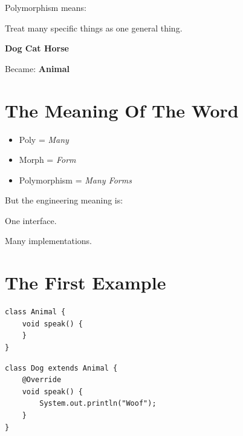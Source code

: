 \documentclass[11pt,a4paper]{book}
\begin{document}
\begin{idea}

Polymorphism means:

Treat many specific things
as one general thing.

\end{idea}

\textbf{ Dog   Cat   Horse }

Became:
\textbf{ Animal }

\section{The Meaning Of The Word}
\begin{itemize}
\item \textcolor{RosettaRoyalPurple}{Poly} = \emph{Many}


\item \textcolor{RosettaRoyalPurple}{Morph} = \emph{Form}


\item \textcolor{RosettaRoyalPurple}{Polymorphism} = \emph{Many Forms}
\end{itemize}
But the engineering meaning is:

\begin{center}
One interface.

Many implementations.

\end{center}


\section{The First Example}

\begin{verbatim}
class Animal {
    void speak() {
    }
}
\end{verbatim}


\begin{verbatim}
class Dog extends Animal {
    @Override
    void speak() {
        System.out.println("Woof");
    }
}
\end{verbatim}
\end{document}

